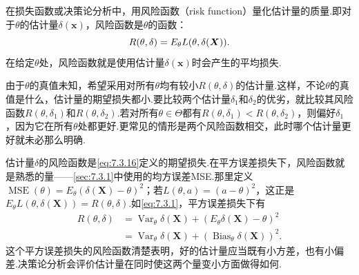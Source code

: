 在损失函数或决策论分析中，用风险函数（risk function）量化估计量的质量.即对于$\theta$的估计量$\delta(\boldsymbol x)$，风险函数是$\theta$的函数：
\begin{equation}\label{eq:7.3.16}\index{SI0914@风险函数}
R(\theta,\delta)=E_\theta L(\theta,\delta(\boldsymbol X)).
\end{equation}
在给定$\theta$处，风险函数就是使用估计量$\delta(\boldsymbol x)$时会产生的平均损失.

由于$\theta$的真值未知，希望采用对所有$\theta$均有较小$R(\theta,\delta)$的估计量.这样，不论$\theta$的真值是什么，估计量的期望损失都小.要比较两个估计量$\delta_1$和$\delta_2$的优劣，就比较其风险函数$R(\theta,\delta_1)$和$R(\theta,\delta_2)$.若对所有$\theta\in\Theta$都有$R(\theta,\delta_1)<R(\theta,\delta_2)$，则偏好$\delta_1$，因为它在所有$\theta$处都更好.更常见的情形是两个风险函数相交，此时哪个估计量更好就未必那么明确.

估计量$\delta$的风险函数是\eqref{eq:7.3.16}定义的期望损失.在平方误差损失下，风险函数就是熟悉的量——\autoref{sec:7.3.1}中使用的均方误差MSE.那里定义$\operatorname{MSE}(\theta)=E_\theta(\delta(\boldsymbol X)-\theta)^2$；若$L(\theta,a)=(a-\theta)^2$，这正是$E_\theta L(\theta,\delta(\boldsymbol X))=R(\theta,\delta)$.如\eqref{eq:7.3.1}，平方误差损失下有
\begin{equation}\label{eq:7.3.17}
\begin{aligned}
R(\theta,\delta)&=\operatorname{Var}_\theta\delta(\boldsymbol X)+(E_\theta\delta(\boldsymbol X)-\theta)^2\\
&=\operatorname{Var}_\theta\delta(\boldsymbol X)+(\operatorname{Bias}_\theta\delta(\boldsymbol X))^2.
\end{aligned}
\end{equation}
这个平方误差损失的风险函数清楚表明，好的估计量应当既有小方差，也有小偏差.决策论分析会评价估计量在同时使这两个量变小方面做得如何.

